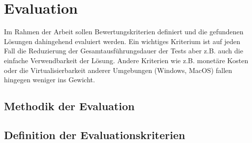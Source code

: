 \section{Evaluation}

Im Rahmen der Arbeit sollen Bewertungskriterien definiert und die gefundenen Lösungen dahingehend evaluiert werden. Ein wichtiges Kriterium ist auf jeden Fall die Reduzierung der Gesamtausführungsdauer der Tests aber z.B. auch die einfache Verwendbarkeit der Lösung. Andere Kriterien wie z.B. monetäre Kosten oder die Virtualisierbarkeit anderer Umgebungen (Windows, MacOS) fallen hingegen weniger ins Gewicht.

\subsection{Methodik der Evaluation}

\subsection{Definition der Evaluationskriterien}
